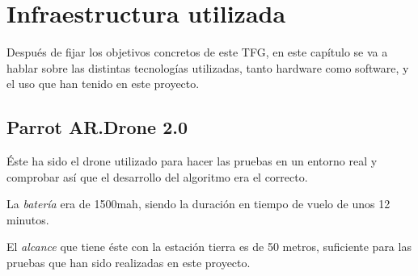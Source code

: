\chapter{Infraestructura utilizada}\label{cap.infraestructura}
\hspace{1 cm} Despu\'es de fijar los objetivos concretos de este TFG, en este cap\'itulo se va a hablar sobre las distintas tecnolog\'ias utilizadas, tanto hardware como software, y el uso que han tenido en este proyecto. 

\section{Parrot AR.Drone 2.0 }
\hspace{1 cm} \'Este ha sido el drone utilizado para hacer las pruebas en un entorno real y comprobar as\'i que el desarrollo del algoritmo era el correcto. 

\hspace{1 cm} La \textsl{bater\'ia} era de 1500mah, siendo la duraci\'on en tiempo de vuelo de unos 12 minutos. %

\hspace{1 cm} El \textsl{alcance} que tiene \'este con la estaci\'on tierra es de 50 metros, suficiente para las pruebas que han sido realizadas en este proyecto. 


